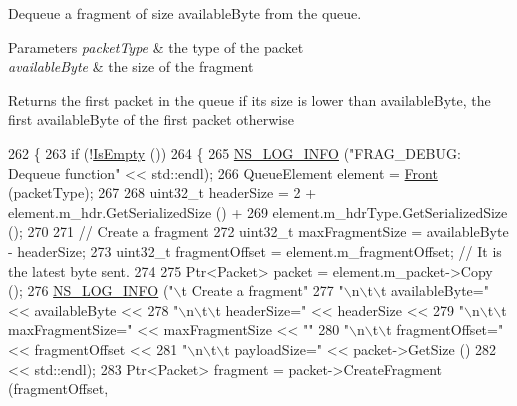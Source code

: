 Dequeue a fragment of size available\+Byte from the queue. 


\begin{DoxyParams}{Parameters}
{\em packet\+Type} & the type of the packet \\
\hline
{\em available\+Byte} & the size of the fragment \\
\hline
\end{DoxyParams}
\begin{DoxyReturn}{Returns}
the first packet in the queue if its size is lower than available\+Byte, the first available\+Byte of the first packet otherwise 
\end{DoxyReturn}

\begin{DoxyCode}
262 \{
263   \textcolor{keywordflow}{if} (!\hyperlink{classns3_1_1WimaxMacQueue_a45fc4e6c31ac1789b8fdedf4a8714e12}{IsEmpty} ())
264     \{
265       \hyperlink{group__logging_gafbd73ee2cf9f26b319f49086d8e860fb}{NS\_LOG\_INFO} (\textcolor{stringliteral}{"FRAG\_DEBUG: Dequeue function"} << std::endl);
266       QueueElement element = \hyperlink{classns3_1_1WimaxMacQueue_ab02b8007b7f0090eccaf01a3d3dc0b98}{Front} (packetType);
267 
268       uint32\_t headerSize = 2 + element.m\_hdr.GetSerializedSize () +
269         element.m\_hdrType.GetSerializedSize ();
270 
271       \textcolor{comment}{// Create a fragment}
272       uint32\_t maxFragmentSize = availableByte - headerSize;
273       uint32\_t fragmentOffset = element.m\_fragmentOffset; \textcolor{comment}{// It is the latest byte sent.}
274 
275       Ptr<Packet> packet = element.m\_packet->Copy ();
276       \hyperlink{group__logging_gafbd73ee2cf9f26b319f49086d8e860fb}{NS\_LOG\_INFO} (\textcolor{stringliteral}{"\(\backslash\)t Create a fragment"}
277                    \textcolor{stringliteral}{"\(\backslash\)n\(\backslash\)t\(\backslash\)t availableByte="} << availableByte <<
278                    \textcolor{stringliteral}{"\(\backslash\)n\(\backslash\)t\(\backslash\)t headerSize="} << headerSize <<
279                    \textcolor{stringliteral}{"\(\backslash\)n\(\backslash\)t\(\backslash\)t maxFragmentSize="} << maxFragmentSize << \textcolor{stringliteral}{""}
280                    \textcolor{stringliteral}{"\(\backslash\)n\(\backslash\)t\(\backslash\)t fragmentOffset="} << fragmentOffset <<
281                    \textcolor{stringliteral}{"\(\backslash\)n\(\backslash\)t\(\backslash\)t payloadSize="} << packet->GetSize ()
282                                             << std::endl);
283       Ptr<Packet> fragment = packet->CreateFragment (fragmentOffset,

\end{DoxyCode}
